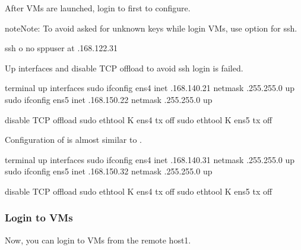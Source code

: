 \documentclass[a4paper,11pt,openany,oneside,english]{sphinxmanual}
\begin{document}
After VMs are launched, login to  first to configure.

\begin{sphinxadmonition}{note}{Note:}
To avoid asked for unknown keys while login VMs, use
 option for ssh.

\begin{sphinxVerbatim}[commandchars=\\\{\},formatcom=\footnotesize]
 ssh \PYGZhy{}o no sppuser at .168.122.31
\end{sphinxVerbatim}
\end{sphinxadmonition}

Up interfaces and disable TCP offload to avoid ssh login is failed.

\begin{sphinxVerbatim}[commandchars=\\\{\},formatcom=\footnotesize]
 terminal 
 up interfaces
 sudo ifconfig ens4 inet .168.140.21 netmask .255.255.0 up
 sudo ifconfig ens5 inet .168.150.22 netmask .255.255.0 up

 disable TCP offload
 sudo ethtool \PYGZhy{}K ens4 tx off
 sudo ethtool \PYGZhy{}K ens5 tx off
\end{sphinxVerbatim}

Configuration of  is almost similar to .

\begin{sphinxVerbatim}[commandchars=\\\{\},formatcom=\footnotesize]
 terminal 
 up interfaces
 sudo ifconfig ens4 inet .168.140.31 netmask .255.255.0 up
 sudo ifconfig ens5 inet .168.150.32 netmask .255.255.0 up

 disable TCP offload
 sudo ethtool \PYGZhy{}K ens4 tx off
 sudo ethtool \PYGZhy{}K ens5 tx off
\end{sphinxVerbatim}


\subsubsection{Login to VMs}
\label{\detokenize{usecases/spp_vf:login-to-vms}}
Now, you can login to VMs from the remote host1.
\end{document}

